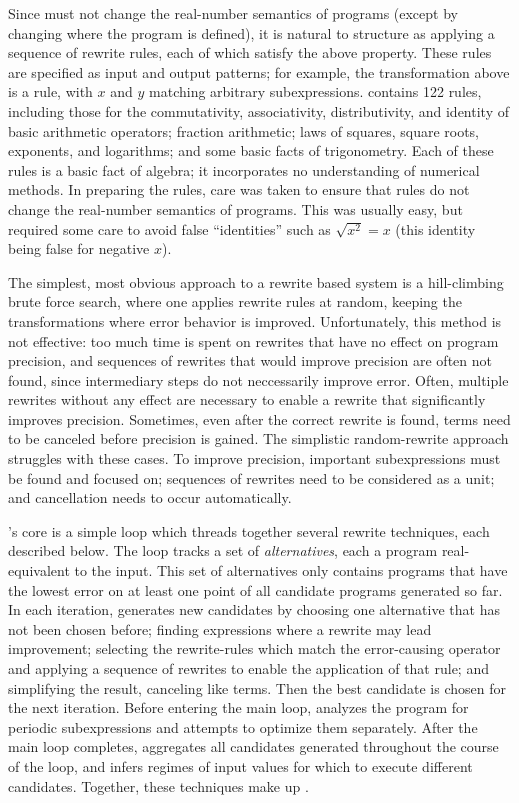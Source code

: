 \documentclass[paper.tex]{subfiles}
\begin{document}
Since \casio must not change the real-number semantics of programs
  (except by changing where the program is defined),
  it is natural to structure \casio
  as applying a sequence of rewrite rules,
  each of which satisfy the above property.
These rules are specified as input and output patterns;
  for example, the transformation above is a rule,
  with $x$ and $y$ matching arbitrary subexpressions.
\casio contains 122 rules,
  including those for
  the commutativity, associativity, distributivity, and identity
  of basic arithmetic operators;
  fraction arithmetic;
  laws of squares, square roots, exponents, and logarithms;
  and some basic facts of trigonometry.
Each of these rules is a basic fact of algebra;
  it incorporates no understanding of numerical methods.
In preparing the rules,
  care was taken to ensure that rules
  do not change the real-number semantics of programs.
This was usually easy, but required some care
  to avoid false ``identities'' such as $\sqrt{x^2} = x$
  (this identity being false for negative $x$).

The simplest, most obvious approach to a rewrite based system
  is a hill-climbing brute force search,
  where one applies rewrite rules at random,
  keeping the transformations where error behavior is improved.
Unfortunately, this method is not effective:
  too much time is spent on rewrites
  that have no effect on program precision,
  and sequences of rewrites that would improve precision
  are often not found, since intermediary steps do not neccessarily improve error.
Often, multiple rewrites without any effect
  are necessary to enable a rewrite that significantly improves precision.
Sometimes, even after the correct rewrite is found,
  terms need to be canceled before precision is gained.
The simplistic random-rewrite approach struggles with these cases.
To improve precision, important subexpressions
  must be found and focused on;
  sequences of rewrites need to be considered as a unit;
  and cancellation needs to occur automatically.

\casio's core is a simple loop
  which threads together several rewrite techniques,
  each described below.
The loop tracks a set of \emph{alternatives},
  each a program real-equivalent to the input.
This set of alternatives only contains
  programs that have the lowest error on at least one point
  of all candidate programs generated so far.
In each iteration, \casio generates new candidates
  by choosing one alternative that has not been chosen before;
  finding expressions where a rewrite may lead improvement;
  selecting the rewrite-rules which match the error-causing operator
  and applying a sequence of rewrites to enable the application of that rule;
  and simplifying the result, canceling like terms.
Then the best candidate is chosen for the next iteration.
Before entering the main loop,
  \casio analyzes the program for periodic subexpressions
  and attempts to optimize them separately.
After the main loop completes,
  \casio aggregates all candidates generated
  throughout the course of the loop,
  and infers regimes of input values for which
  to execute different candidates.
Together, these techniques make up \casio.
\end{document}
